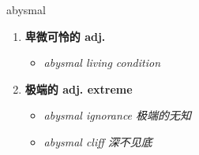 
\begin{frame}
{\huge abysmal}
\begin{center}
\begin{enumerate}\Large
  \item \textbf{卑微可怜的 adj.}
  \begin{itemize}
    \item \em{\Large{abysmal living condition}}
  \end{itemize}
  \item \textbf{极端的 adj. extreme}
  \begin{itemize}
    \item \em{\Large{abysmal ignorance 极端的无知}}
    \item \em{\Large{abysmal cliff 深不见底}}
  \end{itemize}
\end{enumerate}
\end{center}
\end{frame}
